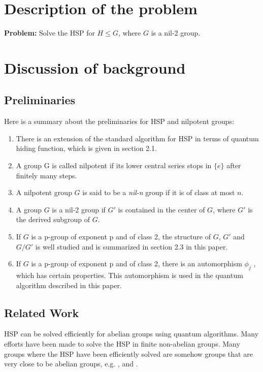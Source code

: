 \documentclass{article}
\begin{document}
\section{Description of the problem}
\textbf{Problem:} Solve the HSP for $H \leq G$, where $G$ is a nil-2 group.

\section{Discussion of background}
\subsection{Preliminaries}
Here is a summary about the preliminaries for HSP and nilpotent groups:

\begin{enumerate}
	\item There is an extension of the standard algorithm for HSP in terms of quantum hiding function, which is given in section 2.1.
	\item A group G is called nilpotent if its lower central series stops in $ \{e\} $ after finitely many steps.
	\item A nilpotent group $ G $ is said to be a \emph{nil-n } group if it is of class at most $ n $.
	\item A group $ G $ is a nil-2 group if $ G' $ is contained in the center of $ G $, where $ G' $ is the derived subgroup of $ G $.
	\item If $ G $ is a p-group of exponent p and of class 2, the structure of $ G $,  $ G' $ and $ G/G' $ is well studied and is summarized in section 2.3 in this paper.
	\item If $ G $ is a p-group of exponent p and of class 2, there is an automorphism $ \phi_{j} $ , which has certain properties. This automorphism is used in the quantum algorithm described in this paper. 
\end{enumerate}

\subsection{Related Work}
HSP can be solved efficiently for abelian groups using quantum algorithms. Many efforts have been made to solve the HSP in finite non-abelian groups. Many groups where the HSP have been efficiently solved are somehow groups that are very close to be abelian groups, e.g. \cite{Grigni}, \cite{Beth} and \cite{Moore}.
\end{document}
